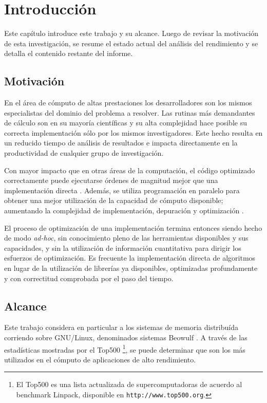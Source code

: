 \documentclass[a4paper]{report}
\begin{document}
\tableofcontents

\chapter{Introducci\'on}

Este cap\'itulo introduce este trabajo y su alcance. Luego de revisar la
motivaci\'on de esta investigaci\'on, se resume el estado actual del an\'alisis
del rendimiento y se detalla el contenido restante del informe.

\section{Motivaci\'on}

En el \'area de c\'omputo de altas prestaciones los desarrolladores son los mismos
especialistas del dominio del problema a resolver. Las rutinas
m\'as demandantes de c\'alculo son en su mayor\'ia cient\'ificas y su
alta complejidad hace posible su correcta implementaci\'on s\'{o}lo por los mismos investigadores.
Este hecho resulta en un reducido tiempo de an\'alisis de resultados
e impacta directamente en la productividad de cualquier grupo de investigaci\'on.

\bigskip

Con mayor impacto que en otras \'areas de la computaci\'on, el c\'odigo
optimizado correctamente puede ejecutarse \'ordenes de magnitud mejor que una implementaci\'on
directa \cite{mm-matrixmultiplicationtool}. Adem\'as, se utiliza
programaci\'on en paralelo para obtener una mejor utilizaci\'on de la
capacidad de c\'omputo disponible; aumentando la complejidad de implementaci\'on, depuraci\'on y
optimizaci\'on \cite{parallel-programming}.

\bigskip

El proceso de optimizaci\'on de una implementaci\'on termina entonces siendo
hecho de modo {\it ad-hoc}, sin conocimiento pleno de las herramientas disponibles y
sus capacidades, y sin la utilizaci\'on de informaci\'on cuantitativa para dirigir los
esfuerzos de optimizaci\'on. Es frecuente la implementaci\'on directa
de algoritmos en lugar de la utilizaci\'on de librer\'ias ya disponibles, optimizadas
profundamente y con correctitud comprobada por el paso del tiempo.

\section{Alcance}

Este trabajo considera en particular a los sistemas de memoria distribu\'ida corriendo sobre
GNU/Linux, denominados sistemas Beowulf \cite{beowulf}. A trav\'es de las
estad\'isticas mostradas por el Top500 \footnote{El Top500 es una lista actualizada de supercomputadoras
de acuerdo al benchmark Linpack, disponible en {\tt http://www.top500.org}.}, se
puede determinar que son los m\'as utilizados en el c\'omputo de aplicaciones de alto rendimiento.
\end{document}
